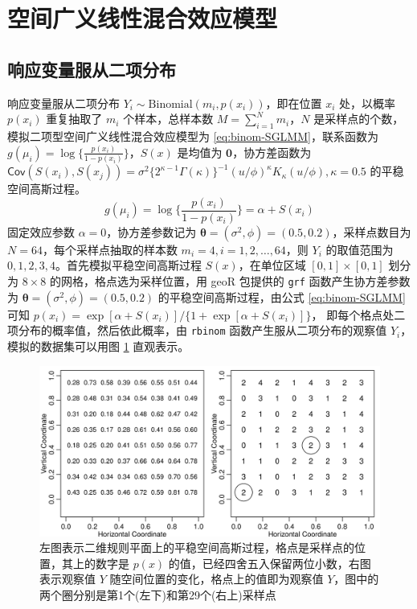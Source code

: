 \documentclass[12pt,a4paper,UTF8,twoside]{book}
\theoremstyle{definition}
\theoremstyle{definition}
\theoremstyle{definition}
\theoremstyle{remark}
\begin{document}
\hypertarget{sim-sglmm}{%
\section{空间广义线性混合效应模型}\label{sim-sglmm}}

\hypertarget{sim-binomal-sglmm}{%
\subsection{响应变量服从二项分布}\label{sim-binomal-sglmm}}

响应变量服从二项分布
\(Y_{i} \sim \mathrm{Binomial}(m_{i},p(x_{i}))\)，即在位置 \(x_i\)
处，以概率 \(p(x_i)\) 重复抽取了 \(m_i\) 个样本，总样本数
\(M=\sum_{i=1}^{N}m_i\)，\(N\)
是采样点的个数，模拟二项型空间广义线性混合效应模型为
\eqref{eq:binom-SGLMM}，联系函数为
\(g(\mu_i) = \log\{\frac{p(x_i)}{1-p(x_i)}\}\)，\(S(x)\) 是均值为
\(\mathbf{0}\)，协方差函数为
\(\mathsf{Cov}(S(x_i),S(x_j)) = \sigma^2 \big\{2^{\kappa-1}\Gamma(\kappa)\big\}^{-1}(u/\phi)^{\kappa}K_{\kappa}(u/\phi), \kappa = 0.5\)
的平稳空间高斯过程。 \begin{equation}
g(\mu_i) = \log\big\{\frac{p(x_i)}{1-p(x_i)}\big\} = \alpha + S(x_i) \label{eq:binom-SGLMM}
\end{equation} 固定效应参数 \(\alpha = 0\)，协方差参数记为
\(\boldsymbol{\theta} = (\sigma^2, \phi) = (0.5, 0.2)\)，采样点数目为
\(N = 64\)，每个采样点抽取的样本数 \(m_i = 4, i = 1, 2, \ldots, 64\)，则
\(Y_i\) 的取值范围为 \(0, 1, 2, 3, 4\)。首先模拟平稳空间高斯过程
\(S(x)\)，在单位区域 \([0,1] \times [0,1]\) 划分为 \(8 \times 8\)
的网格，格点选为采样位置，用 geoR 包提供的 \texttt{grf}
函数产生协方差参数为
\(\boldsymbol{\theta} = (\sigma^2,\phi) = (0.5, 0.2)\)
的平稳空间高斯过程，由公式 \eqref{eq:binom-SGLMM} 可知
\(p(x_i) = \exp[\alpha + S(x_i)]/\{1 + \exp[\alpha + S(x_i)]\}\)，
即每个格点处二项分布的概率值，然后依此概率，由 \texttt{rbinom}
函数产生服从二项分布的观察值 \(Y_i\)，模拟的数据集可以用图
\ref{fig:binom-without-nugget-geoRglm} 直观表示。

\begin{figure}

{\centering \includegraphics[width=0.9\linewidth]{figures/binom-without-nugget-geoRglm} 

}

\caption{左图表示二维规则平面上的平稳空间高斯过程，格点是采样点的位置，其上的数字是 $p(x)$ 的值，已经四舍五入保留两位小数，右图表示观察值 $Y$ 随空间位置的变化，格点上的值即为观察值 $Y$，图中的两个圈分别是第1个(左下)和第29个(右上)采样点}\label{fig:binom-without-nugget-geoRglm}
\end{figure}
\end{document}
